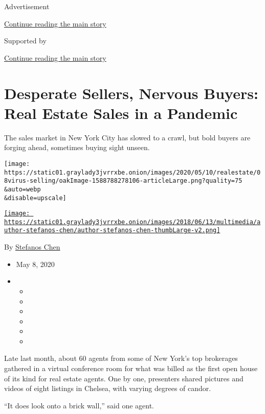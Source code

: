 Advertisement

\protect\hyperlink{after-top}{Continue reading the main story}

Supported by

\protect\hyperlink{after-sponsor}{Continue reading the main story}

\hypertarget{desperate-sellers-nervous-buyers-real-estate-sales-in-a-pandemic}{%
\section{Desperate Sellers, Nervous Buyers: Real Estate Sales in a
Pandemic}\label{desperate-sellers-nervous-buyers-real-estate-sales-in-a-pandemic}}

The sales market in New York City has slowed to a crawl, but bold buyers
are forging ahead, sometimes buying sight unseen.

\texttt{[image: https://static01.graylady3jvrrxbe.onion/images/2020/05/10/realestate/08virus-selling/oakImage-1588788278106-articleLarge.png?quality=75\\\&auto=webp\\\&disable=upscale]}

\href{https://www.nytimes3xbfgragh.onion/by/stefanos-chen}{\texttt{[image: https://static01.graylady3jvrrxbe.onion/images/2018/06/13/multimedia/author-stefanos-chen/author-stefanos-chen-thumbLarge-v2.png]}}

By \href{https://www.nytimes3xbfgragh.onion/by/stefanos-chen}{Stefanos
Chen}

\begin{itemize}
\item
  May 8, 2020
\item
  \begin{itemize}
  \item
  \item
  \item
  \item
  \item
  \item
  \end{itemize}
\end{itemize}

Late last month, about 60 agents from some of New York's top brokerages
gathered in a virtual conference room for what was billed as the first
open house of its kind for real estate agents. One by one, presenters
shared pictures and videos of eight listings in Chelsea, with varying
degrees of candor.

``It does look onto a brick wall,'' said one agent.

